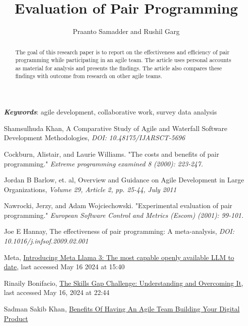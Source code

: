 \documentclass{article}
\title{Evaluation of Pair Programming}
\author{ Praanto Samadder and Rushil Garg }
\begin{document}
\maketitle
\begin{abstract}
    The goal of this research paper is to report on the effectiveness and efficiency of pair programming while participating in an agile team. The article uses personal accounts as material for analysis and presents the findings. The article also compares these findings with outcome from research on other agile teams.
\end{abstract}

\textbf{\textit{Keywords}}: agile development, collaborative work, survey data analysis








\begin{thebibliography}{1000}
    Shamsulhuda Khan,
    A Comparative Study of Agile and Waterfall Software Development Methodologies, \textit{DOI: 10.48175/IJARSCT-5696}
    
    Cockburn, Alistair, and Laurie Williams. "The costs and benefits of pair programming." \textit{Extreme programming examined 8 (2000): 223-247.}
    
    Jordan B Barlow, et. al, Overview and Guidance on Agile Development in Large Organizations, \textit{Volume 29, Article 2, pp. 25-44, July 2011}



    Nawrocki, Jerzy, and Adam Wojciechowski. "Experimental evaluation of pair programming." \textit{European Software Control and Metrics (Escom) (2001): 99-101.}

    Joe E Hannay, The effectiveness of pair programming: A meta-analysis, \textit{DOI: 10.1016/j.infsof.2009.02.001}


    Meta, \href{https://ai.meta.com/blog/meta-llama-3/}{Introducing Meta Llama 3: The most capable openly available LLM to date}, last accessed May 16 2024 at 15:40

    Rinaily Bonifacio, \href{https://www.shiftbase.com/glossary/skills-gap}{The Skills Gap Challenge: Understanding and Overcoming It}, last accessed May 16, 2024 at 22:44

    Sadman Sakib Khan, \href{https://polygontechnology.io/benefits-of-having-an-agile-team-building-your-digital-product/}{Benefits Of Having An Agile Team Building Your Digital Product}

\end{thebibliography}
\end{document}
